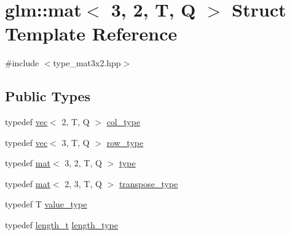 \hypertarget{structglm_1_1mat_3_013_00_012_00_01_t_00_01_q_01_4}{}\section{glm\+:\+:mat$<$ 3, 2, T, Q $>$ Struct Template Reference}
\label{structglm_1_1mat_3_013_00_012_00_01_t_00_01_q_01_4}


{\ttfamily \#include $<$type\+\_\+mat3x2.\+hpp$>$}

\subsection*{Public Types}
\begin{DoxyCompactItemize}
\item 
typedef \mbox{\hyperlink{structglm_1_1vec}{vec}}$<$ 2, T, Q $>$ \mbox{\hyperlink{structglm_1_1mat_3_013_00_012_00_01_t_00_01_q_01_4_aa610dcaaae528e1eea8bdaaa435ad3a4}{col\+\_\+type}}
\item 
typedef \mbox{\hyperlink{structglm_1_1vec}{vec}}$<$ 3, T, Q $>$ \mbox{\hyperlink{structglm_1_1mat_3_013_00_012_00_01_t_00_01_q_01_4_a0b91ceeaafce26ca1b6b64f8ea34dbb1}{row\+\_\+type}}
\item 
typedef \mbox{\hyperlink{structglm_1_1mat}{mat}}$<$ 3, 2, T, Q $>$ \mbox{\hyperlink{structglm_1_1mat_3_013_00_012_00_01_t_00_01_q_01_4_acc76b4ad182b342b586dce28e0da8e16}{type}}
\item 
typedef \mbox{\hyperlink{structglm_1_1mat}{mat}}$<$ 2, 3, T, Q $>$ \mbox{\hyperlink{structglm_1_1mat_3_013_00_012_00_01_t_00_01_q_01_4_ab5fe2bf92b71a51cd33be87c6c9ef7d1}{transpose\+\_\+type}}
\item 
typedef T \mbox{\hyperlink{structglm_1_1mat_3_013_00_012_00_01_t_00_01_q_01_4_ae1e6e1cc8ff07c13ae805cabd6cefd77}{value\+\_\+type}}
\item 
typedef \mbox{\hyperlink{namespaceglm_a090a0de2260835bee80e71a702492ed9}{length\+\_\+t}} \mbox{\hyperlink{structglm_1_1mat_3_013_00_012_00_01_t_00_01_q_01_4_ac2f268fa5e899b2a6ad8139183ed61d4}{length\+\_\+type}}
\end{DoxyCompactItemize}
